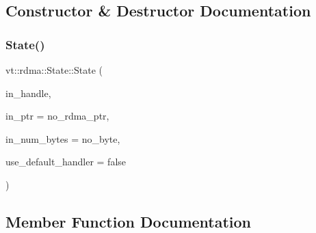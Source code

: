 \subsection{Constructor \& Destructor Documentation}
\mbox{\label{structvt_1_1rdma_1_1_state_a7ab4e08a915e4b8357e8f079844c9378}} 
\subsubsection{\texorpdfstring{State()}{State()}}
{\footnotesize\ttfamily vt\+::rdma\+::\+State\+::\+State (\begin{DoxyParamCaption}\item[{\hyperlink{namespacevt_a10442579ec4e7ebef223818e64bcf908}{R\+D\+M\+A\+\_\+\+Handle\+Type} const \&}]{in\+\_\+handle,  }\item[{\hyperlink{namespacevt_aab05b4a584f7ee835a6d0f66915cf59b}{R\+D\+M\+A\+\_\+\+Ptr\+Type} const \&}]{in\+\_\+ptr = {\ttfamily no\+\_\+rdma\+\_\+ptr},  }\item[{\hyperlink{namespacevt_aab8d55968084610ce3b17057981e9300}{Byte\+Type} const \&}]{in\+\_\+num\+\_\+bytes = {\ttfamily no\+\_\+byte},  }\item[{bool const \&}]{use\+\_\+default\+\_\+handler = {\ttfamily false} }\end{DoxyParamCaption})}



\subsection{Member Function Documentation}
\mbox{\label{structvt_1_1rdma_1_1_state_a1bf31d5a7099c678a004b12e374ad220}} 
